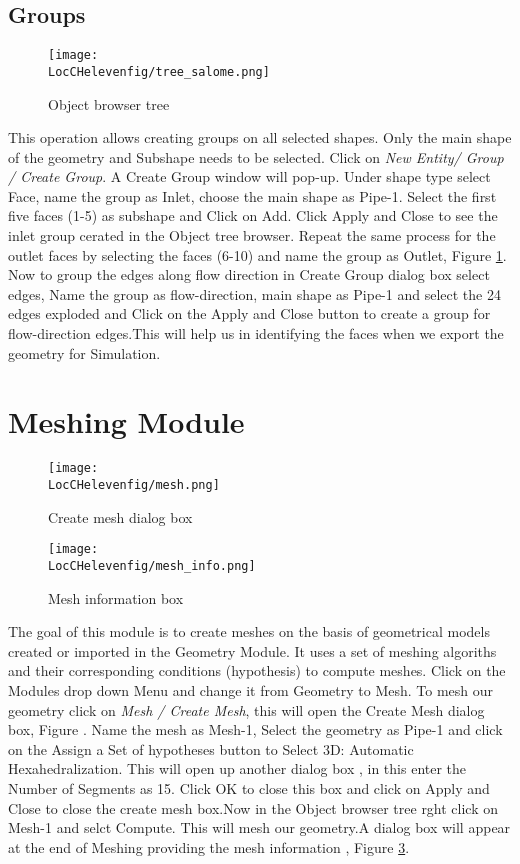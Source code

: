\subsection*{Groups}

\begin{figure}[h]  
\centering
\texttt{[image: \\LocCHelevenfig/tree\_salome.png]}
\caption{Object browser tree}
\label{tree-salome}
\end{figure}

This operation allows creating groups on all selected shapes. Only the main shape of the geometry and Subshape needs to be selected. Click on \textit{New Entity/ Group / Create Group}. A Create Group window will pop-up. Under shape type select Face, name the group as Inlet, choose the main shape as Pipe-1. Select the first five faces (1-5) as subshape and Click on Add. Click Apply and Close to see the inlet group cerated in the Object tree browser. Repeat the same process for the outlet faces by selecting the faces (6-10) and name the group as Outlet, Figure \ref{tree-salome}. Now to group the edges along flow direction in Create Group dialog box select edges, Name the group as flow-direction, main shape as Pipe-1 and select the 24 edges exploded and Click on the Apply and Close button to create a group for flow-direction edges.This will help us in identifying the faces when we export the geometry for Simulation.

\section{Meshing Module}

\begin{figure}[h]  
\centering
\texttt{[image: \\LocCHelevenfig/mesh.png]}
\caption{Create mesh dialog box}
\label{edges}
\end{figure}

\begin{figure}[h]  
\centering
\texttt{[image: \\LocCHelevenfig/mesh\_info.png]}
\caption{Mesh information box}
\label{meshinfo}
\end{figure}

The goal of this module is to create meshes on the basis of geometrical models created or imported in the Geometry Module. It uses a set of meshing algoriths and their corresponding conditions (hypothesis) to compute meshes. Click on the Modules drop down Menu and change it from Geometry to Mesh. To mesh our geometry click on \textit{Mesh / Create Mesh}, this will open the Create Mesh dialog box, Figure . Name the mesh as Mesh-1, Select the geometry as Pipe-1 and click on the Assign a Set of hypotheses button to Select 3D: Automatic Hexahedralization. This will open up another dialog box , in this enter the Number of Segments as 15. Click OK to close this box and click on Apply and Close to close the create mesh box.Now in the Object browser tree rght click on Mesh-1 and selct Compute. This will mesh our geometry.A dialog box will appear at the end of Meshing providing the mesh information , Figure \ref{meshinfo}.\newline

